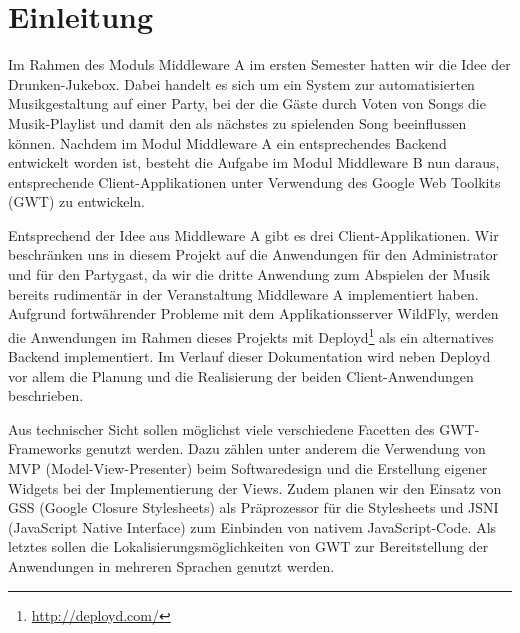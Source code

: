 \section{Einleitung}
Im Rahmen des Moduls Middleware A im ersten Semester hatten wir die Idee der Drunken-Jukebox. Dabei handelt es sich um ein System zur automatisierten Musikgestaltung auf einer Party, bei der die Gäste durch Voten von Songs die Musik-Playlist und damit den als nächstes zu spielenden Song beeinflussen können. Nachdem im Modul Middleware A ein entsprechendes Backend entwickelt worden ist, besteht die Aufgabe im Modul Middleware B nun daraus, entsprechende Client-Applikationen unter Verwendung des Google Web Toolkits (GWT) zu entwickeln.

Entsprechend der Idee aus Middleware A gibt es drei Client-Applikationen. Wir beschränken uns in diesem Projekt auf die Anwendungen für den Administrator und für den Partygast, da wir die dritte Anwendung zum Abspielen der Musik bereits rudimentär in der Veranstaltung Middleware A implementiert haben. Aufgrund fortwährender Probleme mit dem Applikationsserver WildFly, werden die Anwendungen im Rahmen dieses Projekts mit Deployd\footnote{\url{http://deployd.com/}} als ein alternatives Backend implementiert. Im Verlauf dieser Dokumentation wird neben Deployd vor allem die Planung und die Realisierung der beiden Client-Anwendungen beschrieben.

Aus technischer Sicht sollen möglichst viele verschiedene Facetten des GWT-Frameworks genutzt werden. Dazu zählen unter anderem die Verwendung von MVP (Model-View-Presenter) beim Softwaredesign und die Erstellung eigener Widgets bei der Implementierung der Views. Zudem planen wir den Einsatz von GSS (Google Closure Stylesheets) als Präprozessor für die Stylesheets und JSNI (JavaScript Native Interface) zum Einbinden von nativem JavaScript-Code. Als letztes sollen die Lokalisierungsmöglichkeiten von GWT zur Bereitstellung der Anwendungen in mehreren Sprachen genutzt werden.